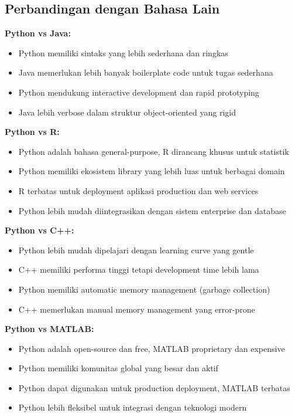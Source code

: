 \subsection*{Perbandingan dengan Bahasa Lain}

\textbf{Python vs Java:}
\begin{itemize}
  \item Python memiliki sintaks yang lebih sederhana dan ringkas
  \item Java memerlukan lebih banyak boilerplate code untuk tugas sederhana
  \item Python mendukung interactive development dan rapid prototyping
  \item Java lebih verbose dalam struktur object-oriented yang rigid
\end{itemize}

\textbf{Python vs R:}
\begin{itemize}
  \item Python adalah bahasa general-purpose, R dirancang khusus untuk statistik
  \item Python memiliki ekosistem library yang lebih luas untuk berbagai domain
  \item R terbatas untuk deployment aplikasi production dan web services
  \item Python lebih mudah diintegrasikan dengan sistem enterprise dan database
\end{itemize}

\textbf{Python vs C++:}
\begin{itemize}
  \item Python lebih mudah dipelajari dengan learning curve yang gentle
  \item C++ memiliki performa tinggi tetapi development time lebih lama
  \item Python memiliki automatic memory management (garbage collection)
  \item C++ memerlukan manual memory management yang error-prone
\end{itemize}

\textbf{Python vs MATLAB:}
\begin{itemize}
  \item Python adalah open-source dan free, MATLAB proprietary dan expensive
  \item Python memiliki komunitas global yang besar dan aktif
  \item Python dapat digunakan untuk production deployment, MATLAB terbatas
  \item Python lebih fleksibel untuk integrasi dengan teknologi modern
\end{itemize}

